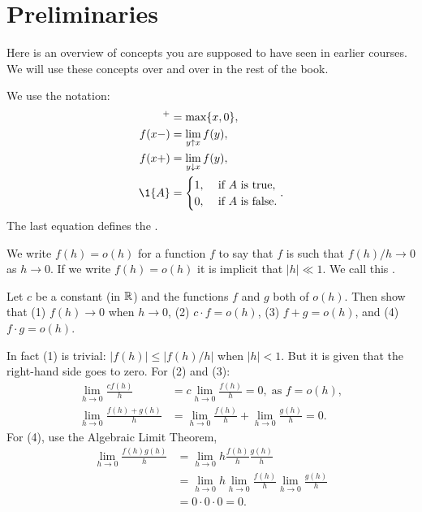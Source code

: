 \documentclass[companion.tex]{subfiles}
\begin{document}
\section{Preliminaries}
\label{sec:preliminaries}


Here is an overview of concepts you are supposed to have seen in earlier courses.
We will use these concepts over and over in the rest of the book.




We use the notation:
 \begin{align*}
 [x]^+ &= \max\{x, 0\}, \\
 f(x-) &= \lim_{y\uparrow x} f(y),\\
 f(x+) &= \lim_{y\downarrow x} f(y),\\
 \1{A} &=
 \begin{cases}
 1, & \text{ if $A$ is true}, \\
 0, & \text{ if $A$ is false}.
 \end{cases}.
\end{align*}
The last equation defines the .


We write $f(h)=o(h)$ for a function $f$ to say that $f$ is such that $f(h)/h \to 0$ as $h\to 0$.
If we write $f(h) = o(h)$ it is implicit that $|h| \ll 1$.
We call this .
\begin{exercise}
 Let $c$ be a constant (in $\mathbb{R}$) and the functions $f$ and $g$ both of $o(h)$. Then show that (1) $f(h) \to 0$ when $h\to 0$, (2) $c\cdot f = o(h)$, (3) $f+g=o(h)$, and (4) $f\cdot g=o(h)$. 
\begin{solution}
 In fact (1) is trivial: $|f(h)| \leq |f(h)/h|$ when $|h| < 1$.
 But it is given that the right-hand side goes to zero.
 For (2) and (3):
\begin{align*}
\lim_{h\to 0} \frac{c f(h)}{h} &= c \lim_{h\to 0} \frac{f(h)}{h} = 0, \; \text{as } f = o(h), \\
\lim_{h\to 0} \frac{f(h) + g(h)} h &= \lim_{h\to 0} \frac{f(h)} h + \lim_{h\to 0} \frac{g(h)} h = 0.
\end{align*}
For (4), use the Algebraic Limit Theorem,
\begin{align*}
\lim_{h\to 0} \frac{f(h)g(h)}{h} &= \lim_{h\to 0} h \frac{f(h)}{h} \frac{g(h)}{h} \\
&= \lim_{h\to 0} h \lim_{h\to 0} \frac{f(h)}{h} \lim_{h\to 0} \frac{g(h)}{h} \\
&= 0 \cdot 0 \cdot 0 = 0.
\end{align*}
\end{solution}
\end{exercise}
\end{document}
